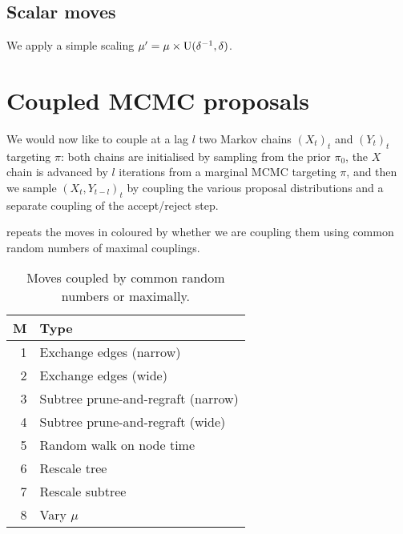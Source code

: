 \documentclass[11pt,a4paper]{article}
\begin{document}
\subsection{Scalar moves}

We apply a simple scaling $ \mu' = \mu \times \mathrm{U}(\delta^{-1}, \delta) $.

\section{Coupled MCMC proposals}

We would now like to couple at a lag $ l $ two Markov chains $ (X_t)_t $ and $ (Y_t)_t $ targeting $ \pi $: both chains are initialised by sampling from the prior $ \pi_0 $, the $ X $ chain is advanced by $ l $ iterations from a marginal MCMC targeting $ \pi $, and then we sample $ (X_t, Y_{t - l})_t $ by coupling the various proposal distributions and a separate coupling of the accept/reject step.

 repeats the moves in  coloured by whether we are coupling them using common random numbers of maximal couplings.

\begin{table}[htb]
    \centering
    \caption{Moves coupled by \colorbox{myblue!50}{common random numbers} or \colorbox{mygreen!50}{maximally}.}
    \label{tab:moves-coupled}
    \begin{tabular}{rl}
        \toprule
        M & Type \\ \midrule
        \rowcolor{myblue!50}
        1 & Exchange edges (narrow)\\
        \rowcolor{myblue!50}
        2 & Exchange edges (wide) \\
        \rowcolor{mygreen!50}
        3 & Subtree prune-and-regraft (narrow)\\
        \rowcolor{mygreen!50}
        4 & Subtree prune-and-regraft (wide) \\
        \rowcolor{mygreen!50}
        5 & Random walk on node time \\
        \rowcolor{myblue!50}
        6 & Rescale tree \\
        \rowcolor{myblue!50}
        7 & Rescale subtree \\
        \rowcolor{mygreen!50}
        8 & Vary $ \mu $ \\
        \bottomrule
    \end{tabular}
\end{table}
\end{document}
